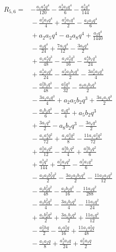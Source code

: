 \begin{align*}
R_{5,6}={}&- \frac{a_{1} a_{2}^{4} q^{4}}{120} - \frac{a_{2}^{3} a_{3} q^{4}}{6} - \frac{a_{2}^{3} q^{4}}{144}\\
&{}- \frac{a_{2}^{2} a_{3} q^{4}}{4} + \frac{a_{2}^{2} a_{5} q^{4}}{2} - \frac{a_{2} a_{3} q^{4}}{6}\\
&{}+ a_{2} a_{5} q^{4} - a_{2} a_{8} q^{4} + \frac{a_{2} q^{4}}{1440}\\
&{}- \frac{a_{3} q^{4}}{24} + \frac{7 a_{5} q^{4}}{12} - \frac{3 a_{8} q^{4}}{2}\\
&{}+ \frac{a_{1} a_{2}^{4} q^{3}}{48} - \frac{a_{1} a_{2}^{3} q^{3}}{16} - \frac{a_{2}^{4} b_{1} q^{3}}{24}\\
&{}+ \frac{a_{2}^{3} a_{3} q^{3}}{24} - \frac{a_{2}^{2} a_{3} b_{2} q^{3}}{2} - \frac{3 a_{2}^{2} a_{3} q^{3}}{4}\\
&{}- \frac{a_{2}^{2} b_{2} q^{3}}{48} - \frac{a_{2}^{2} q^{3}}{32} - \frac{a_{2} a_{3} b_{2} q^{3}}{2}\\
&{}- \frac{3 a_{2} a_{3} q^{3}}{4} + a_{2} a_{5} b_{2} q^{3} + \frac{3 a_{2} a_{5} q^{3}}{2}\\
&{}- \frac{a_{3} b_{2} q^{3}}{6} - \frac{a_{3} q^{3}}{4} + a_{5} b_{2} q^{3}\\
&{}+ \frac{3 a_{5} q^{3}}{2} - a_{8} b_{2} q^{3} - \frac{3 a_{8} q^{3}}{2}\\
&{}- \frac{a_{1} a_{2}^{4} q^{2}}{72} + \frac{a_{1} a_{2}^{3} q^{2}}{8} - \frac{11 a_{1} a_{2}^{2} q^{2}}{72}\\
&{}+ \frac{a_{2}^{3} a_{3} q^{2}}{12} - \frac{a_{2}^{3} b_{1} q^{2}}{4} + \frac{a_{2}^{3} b_{3} q^{2}}{6}\\
&{}+ \frac{a_{2}^{3} q^{2}}{144} + \frac{a_{2}^{2} a_{3} q^{2}}{3} - \frac{a_{2}^{2} a_{5} q^{2}}{6}\\
&{}- \frac{a_{2} a_{3} b_{2}^{2} q^{2}}{2} - \frac{3 a_{2} a_{3} b_{2} q^{2}}{2} - \frac{11 a_{2} a_{3} q^{2}}{12}\\
&{}- \frac{a_{2} b_{2}^{2} q^{2}}{48} - \frac{a_{2} b_{2} q^{2}}{16} - \frac{11 a_{2} q^{2}}{288}\\
&{}- \frac{a_{3} b_{2}^{2} q^{2}}{4} - \frac{3 a_{3} b_{2} q^{2}}{4} - \frac{11 a_{3} q^{2}}{24}\\
&{}+ \frac{a_{5} b_{2}^{2} q^{2}}{2} + \frac{3 a_{5} b_{2} q^{2}}{2} + \frac{11 a_{5} q^{2}}{12}\\
&{}- \frac{a_{2}^{2} h q}{2} - \frac{a_{1} a_{2}^{3} q}{16} + \frac{11 a_{1} a_{2}^{2} q}{48}\\
&{}- \frac{a_{1} a_{2} q}{8} + \frac{a_{2}^{3} a_{3} q}{24} + \frac{a_{2}^{2} a_{3} q}{2}\\

\end{align*}
